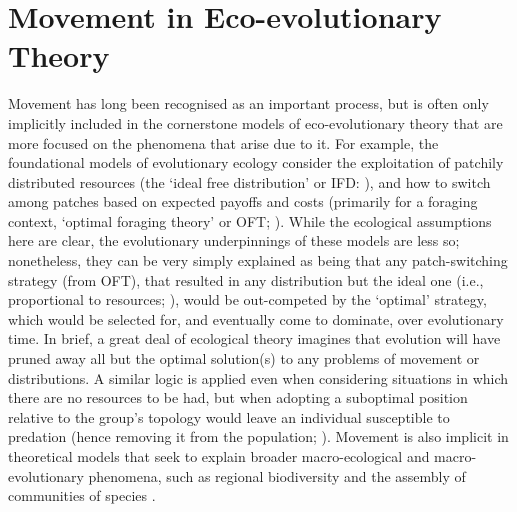 \section*{Movement in Eco-evolutionary Theory}

Movement has long been recognised as an important process, but is often only implicitly included in the cornerstone models of eco-evolutionary theory that are more focused on the phenomena that arise due to it.
For example, the foundational models of evolutionary ecology consider the exploitation of patchily distributed resources (the `ideal free distribution' or IFD: \cite{fretwell1970}), and how to switch among patches based on expected payoffs and costs (primarily for a foraging context, `optimal foraging theory' or OFT; \cite{charnov1976}).
While the ecological assumptions here are clear, the evolutionary underpinnings of these models are less so; nonetheless, they can be very simply explained as being that any patch-switching strategy (from OFT), that resulted in any distribution but the ideal one (i.e., proportional to resources; \cite{parker1978,houston2008}), would be out-competed by the `optimal' strategy, which would be selected for, and eventually come to dominate, over evolutionary time.
In brief, a great deal of ecological theory imagines that evolution will have pruned away all but the optimal solution(s) to any problems of movement or distributions.
A similar logic is applied even when considering situations in which there are no resources to be had, but when adopting a suboptimal position relative to the group's topology would leave an individual susceptible to predation (hence removing it from the population; \cite{hamilton1971}).
Movement is also implicit in theoretical models that seek to explain broader macro-ecological and macro-evolutionary phenomena, such as regional biodiversity and the assembly of communities of species \parencite[island biogegraphy][]{macarthur1967}.

